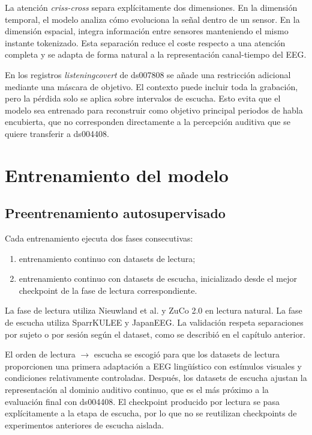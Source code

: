 La atención \textit{criss-cross} separa explícitamente dos dimensiones. En la dimensión temporal, el modelo analiza cómo evoluciona la señal dentro de un sensor. En la dimensión espacial, integra información entre sensores manteniendo el mismo instante tokenizado. Esta separación reduce el coste respecto a una atención completa y se adapta de forma natural a la representación canal-tiempo del EEG.

En los registros \textit{listeningcovert} de ds007808 se añade una restricción adicional mediante una máscara de objetivo. El contexto puede incluir toda la grabación, pero la pérdida solo se aplica sobre intervalos de escucha. Esto evita que el modelo sea entrenado para reconstruir como objetivo principal periodos de habla encubierta, que no corresponden directamente a la percepción auditiva que se quiere transferir a ds004408.

\section{Entrenamiento del modelo}

\subsection{Preentrenamiento autosupervisado}

Cada entrenamiento ejecuta dos fases consecutivas:

\begin{enumerate}
\setlength{\itemsep}{0pt}
\setlength{\parsep}{0pt}
\setlength{\topsep}{2pt}
\setlength{\partopsep}{0pt}
\item entrenamiento continuo con datasets de lectura;
\item entrenamiento continuo con datasets de escucha, inicializado desde el mejor checkpoint de la fase de lectura correspondiente.
\end{enumerate}

La fase de lectura utiliza Nieuwland et al. y ZuCo 2.0 en lectura natural. La fase de escucha utiliza SparrKULEE y JapanEEG. La validación respeta separaciones por sujeto o por sesión según el dataset, como se describió en el capítulo anterior.

El orden de lectura $\rightarrow$ escucha se escogió para que los datasets de lectura proporcionen una primera adaptación a EEG lingüístico con estímulos visuales y condiciones relativamente controladas. Después, los datasets de escucha ajustan la representación al dominio auditivo continuo, que es el más próximo a la evaluación final con ds004408. El checkpoint producido por lectura se pasa explícitamente a la etapa de escucha, por lo que no se reutilizan checkpoints de experimentos anteriores de escucha aislada.

